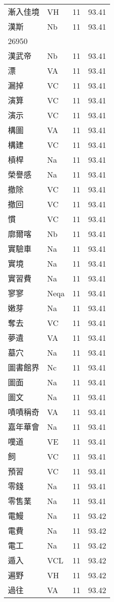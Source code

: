 \documentclass[twocolumn]{book}
\begin{document}
\begin{supertabular}{llrr}
漸入佳境 & VH & 11 &  93.41\\
漢斯 & Nb & 11 &  93.41\\
26950\\
漢武帝 & Nb & 11 &  93.41\\
漂 & VA & 11 &  93.41\\
漏掉 & VC & 11 &  93.41\\
演算 & VC & 11 &  93.41\\
演示 & VC & 11 &  93.41\\
構圖 & VA & 11 &  93.41\\
構建 & VC & 11 &  93.41\\
槓桿 & Na & 11 &  93.41\\
榮譽感 & Na & 11 &  93.41\\
撤除 & VC & 11 &  93.41\\
撤回 & VC & 11 &  93.41\\
慣 & VC & 11 &  93.41\\
廓爾喀 & Nb & 11 &  93.41\\
實驗車 & Na & 11 &  93.41\\
實境 & Na & 11 &  93.41\\
實習費 & Na & 11 &  93.41\\
寥寥 & Neqa & 11 &  93.41\\
嫩芽 & Na & 11 &  93.41\\
奪去 & VC & 11 &  93.41\\
夢遺 & VA & 11 &  93.41\\
墓穴 & Na & 11 &  93.41\\
圖書館界 & Nc & 11 &  93.41\\
圖面 & Na & 11 &  93.41\\
圖文 & Na & 11 &  93.41\\
嘖嘖稱奇 & VA & 11 &  93.41\\
嘉年華會 & Na & 11 &  93.41\\
嘆道 & VE & 11 &  93.41\\
飼 & VC & 11 &  93.41\\
預習 & VC & 11 &  93.41\\
零錢 & Na & 11 &  93.41\\
零售業 & Na & 11 &  93.41\\
電鰻 & Na & 11 &  93.42\\
電費 & Na & 11 &  93.42\\
電工 & Na & 11 &  93.42\\
遁入 & VCL & 11 &  93.42\\
遍野 & VH & 11 &  93.42\\
過往 & VA & 11 &  93.42\\

\end{supertabular}
\end{document}
